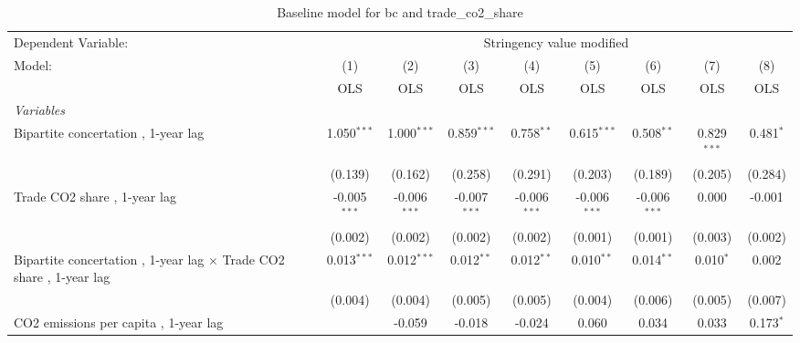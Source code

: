 
\begin{table}[htbp]
   \caption{Baseline model for bc and trade\_co2\_share}
   \centering
   \begin{tabular}{lcccccccc}
      \toprule
      Dependent Variable: & \multicolumn{8}{c}{Stringency value modified}\\
      Model:                                                                     & (1)            & (2)            & (3)            & (4)            & (5)            & (6)            & (7)           & (8)\\  
                                                                                 &  OLS           & OLS            & OLS            & OLS            & OLS            & OLS            & OLS           & OLS\\  
      \midrule
      \emph{Variables}\\
      Bipartite concertation , 1-year lag                                        & 1.050$^{***}$  & 1.000$^{***}$  & 0.859$^{***}$  & 0.758$^{**}$   & 0.615$^{***}$  & 0.508$^{**}$   & 0.829$^{***}$ & 0.481$^{*}$\\   
                                                                                 & (0.139)        & (0.162)        & (0.258)        & (0.291)        & (0.203)        & (0.189)        & (0.205)       & (0.284)\\   
      Trade CO2 share , 1-year lag                                               & -0.005$^{***}$ & -0.006$^{***}$ & -0.007$^{***}$ & -0.006$^{***}$ & -0.006$^{***}$ & -0.006$^{***}$ & 0.000         & -0.001\\   
                                                                                 & (0.002)        & (0.002)        & (0.002)        & (0.002)        & (0.001)        & (0.001)        & (0.003)       & (0.002)\\   
      Bipartite concertation , 1-year lag $\times$ Trade CO2 share , 1-year lag  & 0.013$^{***}$  & 0.012$^{***}$  & 0.012$^{**}$   & 0.012$^{**}$   & 0.010$^{**}$   & 0.014$^{**}$   & 0.010$^{*}$   & 0.002\\   
                                                                                 & (0.004)        & (0.004)        & (0.005)        & (0.005)        & (0.004)        & (0.006)        & (0.005)       & (0.007)\\   
      CO2 emissions per capita , 1-year lag                                      &                & -0.059         & -0.018         & -0.024         & 0.060          & 0.034          & 0.033         & 0.173$^{*}$\\   

\end{tabular}
\end{table}
